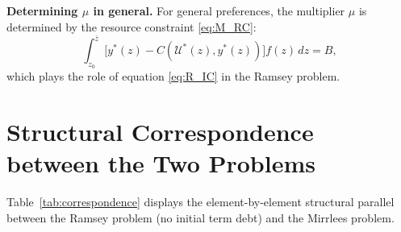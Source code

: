 \documentclass[12pt]{article}
\newcommand{\calU}{\mathcal{U}}
\newcommand{\zbar}{\bar{z}}
\newcommand{\zlow}{z_{0}}
\begin{document}
\medskip\noindent\textbf{Determining $\mu$ in general.}  For general
preferences, the multiplier $\mu$ is determined by the resource constraint
\eqref{eq:M_RC}:
\begin{equation}\label{eq:M_mudet}
  \int_{\zlow}^{\zbar}\bigl[y^\ast(z) - C(\calU^\ast(z), y^\ast(z))\bigr] f(z)\, dz = B,
\end{equation}
which plays the role of equation \eqref{eq:R_IC} in the Ramsey problem.

\section{Structural Correspondence between the Two Problems}
\label{sec:correspondence}

Table~\ref{tab:correspondence} displays the element-by-element structural
parallel between the Ramsey problem (no initial term debt) and the Mirrlees
problem.
\end{document}
